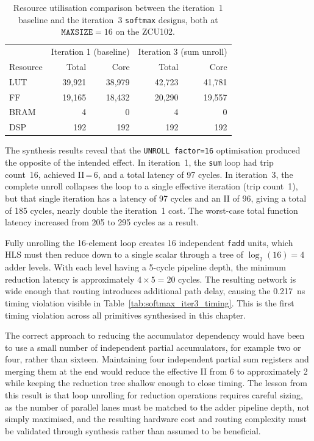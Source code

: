 \begin{table}[H]
  \centering
  \begin{tabular}{lrrrr}
    \toprule
    & \multicolumn{2}{c}{Iteration 1 (baseline)} &
      \multicolumn{2}{c}{Iteration 3 (sum unroll)} \\
    Resource & Total & Core & Total & Core \\
    \midrule
    LUT  & 39{,}921 & 38{,}979 & 42{,}723 & 41{,}781 \\
    FF   & 19{,}165 & 18{,}432 & 20{,}290 & 19{,}557 \\
    BRAM & 4        & 0        & 4        & 0 \\
    DSP  & 192      & 192      & 192      & 192 \\
    \bottomrule
  \end{tabular}
  \caption{Resource utilisation comparison between the iteration~1 baseline
           and the iteration~3 \texttt{softmax} designs, both at
           $\texttt{MAXSIZE} = 16$ on the ZCU102.}
  \label{tab:softmax_iter3_resources}
\end{table}

The synthesis results reveal that the \texttt{UNROLL factor=16}
optimisation produced the opposite of the intended effect. In
iteration~1, the \texttt{sum} loop had trip count~16, achieved II\,=\,6,
and a total latency of 97 cycles. In iteration~3, the complete unroll
collapses the loop to a single effective iteration (trip count~1), but
that single iteration has a latency of 97 cycles and an II of 96,
giving a total of 185 cycles, nearly double the iteration~1 cost.
The worst-case total function latency increased from 205 to 295 cycles
as a result.

Fully unrolling the 16-element loop creates 16 independent
\texttt{fadd} units, which HLS must then reduce down to a single
scalar through a tree of $\log_2(16) = 4$ adder levels. With each
level having a 5-cycle pipeline depth, the minimum reduction latency
is approximately $4 \times 5 = 20$ cycles. The resulting network is
wide enough that routing introduces additional path delay, causing the
\SI{0.217}{\nano\second} timing violation visible in
Table~\ref{tab:softmax_iter3_timing}. This is the first timing
violation across all primitives synthesised in this chapter.

The correct approach to reducing the accumulator dependency would have
been to use a small number of independent partial accumulators, for
example two or four, rather than sixteen. Maintaining four independent
partial sum registers and merging them at the end would reduce the
effective II from 6 to approximately 2 while keeping the reduction tree
shallow enough to close timing. The lesson from this result is that
loop unrolling for reduction operations requires careful sizing, as the
number of parallel lanes must be matched to the adder pipeline depth,
not simply maximised, and the resulting hardware cost and routing
complexity must be validated through synthesis rather than assumed to
be beneficial.

